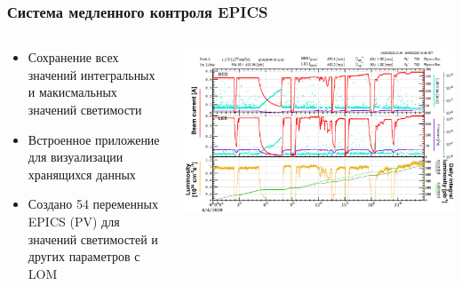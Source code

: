 \documentclass{beamer}
\begin{document}
\begin{frame}
\frametitle{Система медленного контроля EPICS}
  \begin{columns}
    \begin{column}{0.5\textwidth}
      \begin{itemize}
        \item Сохранение всех значений интегральных и макисмальных значений светимости
        \item Встроенное приложение для визуализации хранящихся данных
        \item Создано 54 переменных EPICS (PV) для значений светимостей и других параметров с LOM
      \end{itemize}
    \end{column}
    \begin{column}{0.5\textwidth}
      \begin{center}
        \includegraphics[width=1.0\textwidth, height=0.5\textheight]{dailysnap.jpeg}
      \end{center}
    \end{column}
  \end{columns}
  \begin{table}
  \end{table}
\end{frame}
\end{document}
